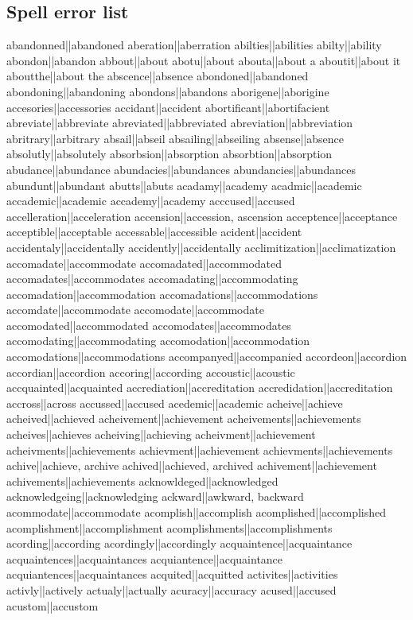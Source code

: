 \subsection{Spell error list}
abandonned||abandoned
aberation||aberration
abilties||abilities
abilty||ability
abondon||abandon
abbout||about
abotu||about
abouta||about a
aboutit||about it
aboutthe||about the
abscence||absence
abondoned||abandoned
abondoning||abandoning
abondons||abandons
aborigene||aborigine
accesories||accessories
accidant||accident
abortificant||abortifacient
abreviate||abbreviate
abreviated||abbreviated
abreviation||abbreviation
abritrary||arbitrary
absail||abseil
absailing||abseiling
absense||absence
absolutly||absolutely
absorbsion||absorption
absorbtion||absorption
abudance||abundance
abundacies||abundances
abundancies||abundances
abundunt||abundant
abutts||abuts
acadamy||academy
acadmic||academic
accademic||academic
accademy||academy
acccused||accused
accelleration||acceleration
accension||accession, ascension
acceptence||acceptance
acceptible||acceptable
accessable||accessible
acident||accident
accidentaly||accidentally
accidently||accidentally
acclimitization||acclimatization
accomadate||accommodate
accomadated||accommodated
accomadates||accommodates
accomadating||accommodating
accomadation||accommodation
accomadations||accommodations
accomdate||accommodate
accomodate||accommodate
accomodated||accommodated
accomodates||accommodates
accomodating||accommodating
accomodation||accommodation
accomodations||accommodations
accompanyed||accompanied
accordeon||accordion
accordian||accordion
accoring||according
accoustic||acoustic
accquainted||acquainted
accrediation||accreditation
accredidation||accreditation
accross||across
accussed||accused
acedemic||academic
acheive||achieve
acheived||achieved
acheivement||achievement
acheivements||achievements
acheives||achieves
acheiving||achieving
acheivment||achievement
acheivments||achievements
achievment||achievement
achievments||achievements
achive||achieve, archive
achived||achieved, archived
achivement||achievement
achivements||achievements
acknowldeged||acknowledged
acknowledgeing||acknowledging
ackward||awkward, backward
acommodate||accommodate
acomplish||accomplish
acomplished||accomplished
acomplishment||accomplishment
acomplishments||accomplishments
acording||according
acordingly||accordingly
acquaintence||acquaintance
acquaintences||acquaintances
acquiantence||acquaintance
acquiantences||acquaintances
acquited||acquitted
activites||activities
activly||actively
actualy||actually
acuracy||accuracy
acused||accused
acustom||accustom
